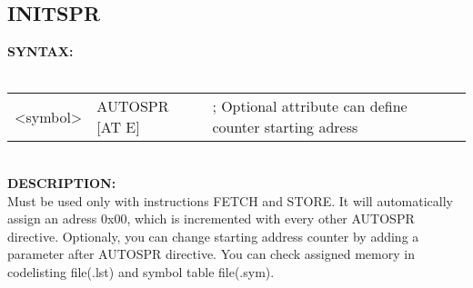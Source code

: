                \subsection{INITSPR}
                \textbf{SYNTAX:}\\
                            \\ {
                                    \texttt{}
                                    \begin{tabular}[h!]{llll}
                                    { \color{highlight_symbol} <symbol> }  &
                                    { \color{highlight_directive} AUTOSPR }
                                    { \color{highlight_constant} [AT E] } & { \color{highlight_comment} ; Optional attribute can define
                                                                                                        counter starting adress }\\
                                    \end{tabular}
                            }
                            \\
            \textbf{DESCRIPTION:}\\
            Must be used only with instructions FETCH and STORE. It will automatically assign an
            adress 0x00, which is incremented with every other AUTOSPR directive. Optionaly, you can change starting address counter by adding a parameter
            after AUTOSPR directive. You can check assigned memory in codelisting file(.lst) and symbol table file(.sym).

